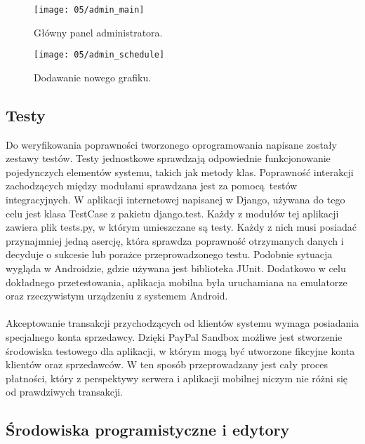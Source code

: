 \newpage

\begin{figure}[p]
	\begin{center}
		\texttt{[image: 05/admin\_main]}
	\end{center}
	\caption{Główny panel administratora.}
	\label{serwer_admin}
\end{figure}

\begin{figure}[p]
	\begin{center}
		\texttt{[image: 05/admin\_schedule]}
	\end{center}
	\caption{Dodawanie nowego grafiku.}
	\label{serwer_schedule}
\end{figure}

\clearpage

\subsection{Testy}

Do weryfikowania poprawności tworzonego oprogramowania napisane zostały zestawy testów. Testy jednostkowe sprawdzają odpowiednie funkcjonowanie pojedynczych elementów systemu, takich jak metody klas. Poprawność interakcji zachodzących między modułami sprawdzana jest za pomocą testów integracyjnych. W aplikacji internetowej napisanej w Django, używana do tego celu jest klasa TestCase z pakietu django.test. Każdy z modułów tej aplikacji zawiera plik tests.py, w którym umieszczane są testy. Każdy z nich musi posiadać przynajmniej jedną asercję, która sprawdza poprawność otrzymanych danych i decyduje o sukcesie lub porażce przeprowadzonego testu. Podobnie sytuacja wygląda w Androidzie, gdzie używana jest biblioteka JUnit. Dodatkowo w celu dokładnego przetestowania, aplikacja mobilna była uruchamiana na emulatorze oraz rzeczywistym urządzeniu z systemem Android.
\\
\\
Akceptowanie transakcji przychodzących od klientów systemu wymaga posiadania specjalnego konta sprzedawcy. Dzięki PayPal Sandbox możliwe jest stworzenie środowiska testowego dla aplikacji, w którym mogą być utworzone fikcyjne konta klientów oraz sprzedawców. W ten sposób przeprowadzany jest cały proces płatności, który z perspektywy serwera i aplikacji mobilnej niczym nie różni się od prawdziwych transakcji. 

\subsection{Środowiska programistyczne i edytory}

